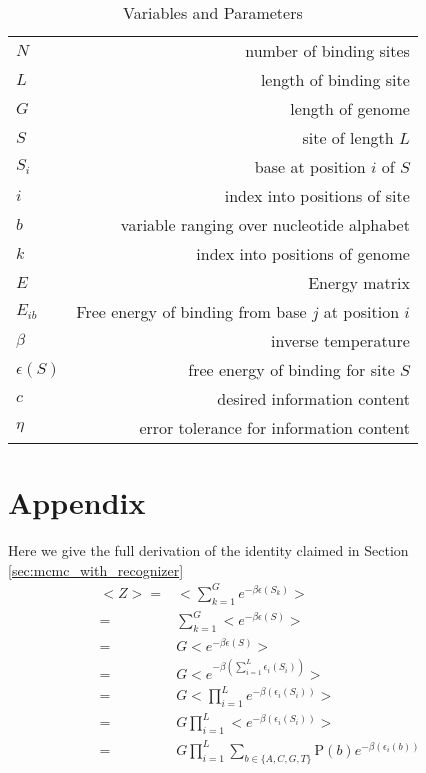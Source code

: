 \documentclass{article}
\renewcommand{\P}{\mathrm{P}}
\begin{document}
\begin{table}[ht]
  \centering
  \begin{tabular}{ l | r }
    \hline                        
    $N$ &  number of binding sites \\
    $L$ &  length of binding site \\
    $G$ &  length of genome \\
    $S$ &  site of length $L$ \\
    $S_i$ &  base at position $i$ of $S$ \\
    $i$ & index into positions of site\\
    $b$ & variable ranging over nucleotide alphabet\\
    $k$ & index into positions of genome\\
    $E$ & Energy matrix\\
    $E_{ib}$ & Free energy of binding from base $j$ at position $i$\\
    $\beta$ & inverse temperature\\
    $\epsilon(S)$ & free energy of binding for site $S$\\
    $c$ & desired information content\\
    $\eta$ & error tolerance for information content\\
    \hline  
  \end{tabular}
  
  \caption{Variables and Parameters}
\label{tab:notation}
\end{table}

 \newpage
\section{Appendix}
\label{sec:appendix}
Here we give the full derivation of the identity claimed in Section \ref{sec:mcmc_with_recognizer}
\begin{align*}
  <Z> =& <\sum_{k=1}^Ge^{-\beta\epsilon(S_k)}>\\
  =& \sum_{k=1}^G<e^{-\beta\epsilon(S)}>\\
  =& G<e^{-\beta\epsilon(S)}>\\
  =& G<e^{-\beta(\sum_{i=1}^L\epsilon_i(S_i))}>\\
  =& G<\prod_{i=1}^Le^{-\beta(\epsilon_i(S_i))}>\\
=& G\prod_{i=1}^L<e^{-\beta(\epsilon_i(S_i))}>\\
=& G\prod_{i=1}^L\sum_{b\in\{A,C,G,T\}}\P(b)e^{-\beta(\epsilon_i(b))}\\
\end{align*}

{}
 \newpage
\end{document}
